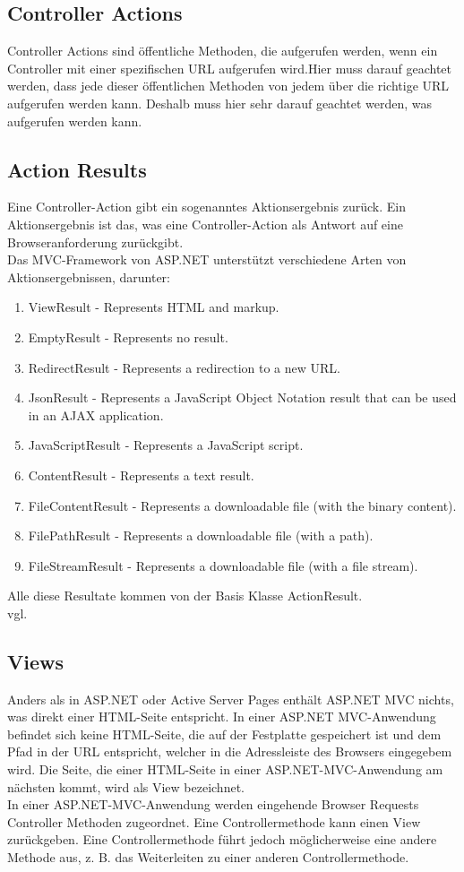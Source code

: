 {\subsection{Controller Actions}
\label{sec:controller_actions}
Controller Actions sind öffentliche Methoden, die aufgerufen werden, wenn ein Controller mit einer spezifischen URL aufgerufen wird.Hier muss darauf geachtet werden, dass jede dieser öffentlichen Methoden von jedem über die richtige URL aufgerufen werden kann. Deshalb muss hier sehr darauf geachtet werden, was aufgerufen werden kann. 
\subsection{Action Results}
\label{sec:controller_actions_results}
Eine Controller-Action gibt ein sogenanntes Aktionsergebnis zurück. Ein Aktionsergebnis ist das, was eine Controller-Action als Antwort auf eine Browseranforderung zurückgibt.\\Das MVC-Framework von ASP.NET unterstützt verschiedene Arten von Aktionsergebnissen, darunter:
\begin{enumerate}
\item ViewResult - Represents HTML and markup.
\item EmptyResult - Represents no result.
\item RedirectResult - Represents a redirection to a new URL.
\item JsonResult - Represents a JavaScript Object Notation result that can be used in an AJAX application.
\item JavaScriptResult - Represents a JavaScript script.
\item ContentResult - Represents a text result.
\item FileContentResult - Represents a downloadable file (with the binary content).
\item FilePathResult - Represents a downloadable file (with a path).
\item FileStreamResult - Represents a downloadable file (with a file stream).
\end{enumerate}
Alle diese Resultate kommen von der Basis Klasse ActionResult.
\\ vgl. \textcite{mic_controller}
\subsection{Views}
\label{sec:Views}
Anders als in ASP.NET oder Active Server Pages enthält ASP.NET MVC nichts, was direkt einer HTML-Seite entspricht. In einer ASP.NET MVC-Anwendung befindet sich keine HTML-Seite, die auf der Festplatte gespeichert ist und dem Pfad in der URL entspricht, welcher in die Adressleiste des Browsers eingegebem wird. Die Seite, die einer HTML-Seite in einer ASP.NET-MVC-Anwendung am nächsten kommt, wird als View bezeichnet.\\
In einer ASP.NET-MVC-Anwendung werden eingehende Browser Requests Controller Methoden zugeordnet. Eine Controllermethode kann einen View zurückgeben. Eine Controllermethode führt jedoch möglicherweise eine andere Methode aus, z. B. das Weiterleiten zu einer anderen Controllermethode.
}
